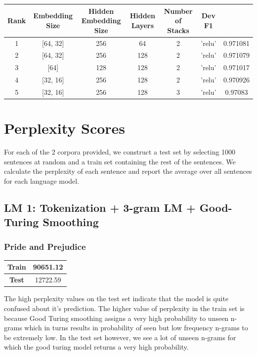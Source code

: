 \documentclass[a4paper,9pt]{report}
\begin{document}
\begin{table}[H]
    \centering
    \begin{tabular}{|c|c|c|c|c|c|c|}
        \textbf{Rank} & \textbf{Embedding Size} & \textbf{Hidden Embedding Size} & \textbf{Hidden Layers} & \textbf{Number of Stacks} & \textbf{Dev F1} \\
        \hline
        1 & [64, 32] & 256 & 64 & 2 & 'relu' & 0.971081 \\
        \hline
        2 & [64, 32] & 256 & 128 & 2 & 'relu' & 0.971079 \\
        \hline
        3 & [64] & 128 & 128 & 2 & 'relu' & 0.971017 \\
        \hline
        4 & [32, 16] & 256 & 128 & 2 & 'relu' & 0.970926 \\
        \hline
        5 & [32, 16] & 256 & 128 & 3 & 'relu' & 0.97083 \\

    \end{tabular}
\end{table}

\section*{Perplexity Scores}
For each of the 2 corpora provided, we construct a test set by selecting 1000 sentences at random and a train set containing the rest of the sentences. We calculate the perplexity of each sentence and report the average over all sentences for each language model.

\subsection*{LM 1: Tokenization + 3-gram LM + Good-Turing Smoothing}
\subsubsection*{Pride and Prejudice}
\begin{table}[H]
    \centering
    \begin{tabular}{|c|c|}
        \hline
        \textbf{Train} & {90651.12} \\
        \hline
        \textbf{Test} & {12722.59} \\
        \hline
    \end{tabular}
\end{table}
The high perplexity values on the test set indicate that the model is quite confused about it's prediction. The higher value of perplexity in the train set is because Good Turing smoothing assigns a very high probability to unseen n-grams which in turns results in probability of seen but low frequency n-grams to be extremely low. 
In the test set however, we see a lot of unseen n-grams for which the good turing model returns a very high probability.
\end{document}
